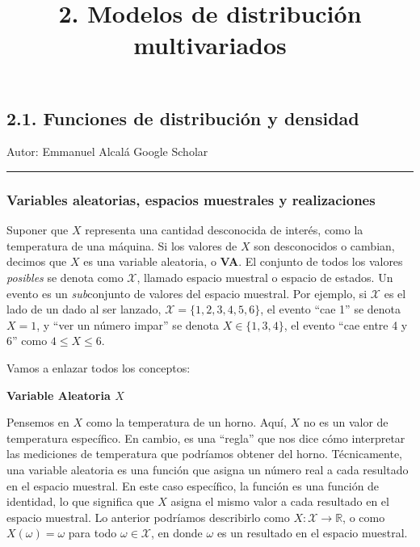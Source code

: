 \documentclass[
  letterpaper,
  DIV=11,
  numbers=noendperiod]{scrartcl}
\title{2. Modelos de distribución multivariados}
\author{}
\date{}
\begin{document}
\maketitle
\ifdefined\Shaded\renewenvironment{Shaded}{\begin{tcolorbox}[enhanced, frame hidden, boxrule=0pt, breakable, interior hidden, sharp corners, borderline west={3pt}{0pt}{shadecolor}]}{\end{tcolorbox}}\fi

\hypertarget{funciones-de-distribuciuxf3n-y-densidad}{%
\subsection{2.1. Funciones de distribución y
densidad}\label{funciones-de-distribuciuxf3n-y-densidad}}

Autor: Emmanuel Alcalá Google Scholar

\begin{center}\rule{0.5\linewidth}{0.5pt}\end{center}

\hypertarget{variables-aleatorias-espacios-muestrales-y-realizaciones}{%
\subsubsection{Variables aleatorias, espacios muestrales y
realizaciones}\label{variables-aleatorias-espacios-muestrales-y-realizaciones}}

Suponer que \(X\) representa una cantidad desconocida de interés, como
la temperatura de una máquina. Si los valores de \(X\) son desconocidos
o cambian, decimos que \(X\) es una variable aleatoria, o \textbf{VA}.
El conjunto de todos los valores \emph{posibles} se denota como
\(\mathcal{X}\), llamado espacio muestral o espacio de estados. Un
evento es un \emph{sub}conjunto de valores del espacio muestral. Por
ejemplo, si \(\mathcal{X}\) es el lado de un dado al ser lanzado,
\(\mathcal{X} = \{ 1, 2, 3, 4, 5, 6 \}\), el evento ``cae 1'' se denota
\(X = 1\), y ``ver un número impar'' se denota \(X \in \{ 1, 3, 4\}\),
el evento ``cae entre 4 y 6'' como \(4 \leq X \leq 6\).

Vamos a enlazar todos los conceptos:

\textbf{Variable Aleatoria \(X\)}

Pensemos en \(X\) como la temperatura de un horno. Aquí, \(X\) no es un
valor de temperatura específico. En cambio, es una ``regla'' que nos
dice cómo interpretar las mediciones de temperatura que podríamos
obtener del horno. Técnicamente, una variable aleatoria es una función
que asigna un número real a cada resultado en el espacio muestral. En
este caso específico, la función es una función de identidad, lo que
significa que \(X\) asigna el mismo valor a cada resultado en el espacio
muestral. Lo anterior podríamos describirlo como
\(X: \mathcal{X} \rightarrow \mathbb{R}\), o como \(X(\omega) = \omega\)
para todo \(\omega \in \mathcal{X}\), en donde \(\omega\) es un
resultado en el espacio muestral.
\end{document}

